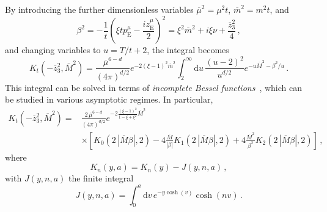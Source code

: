 By introducing the further dimensionless variables $\overline{\mu}^2 = \mu^2 t$,
$\overline{m}^2 = m^2 t$, and 
\begin{equation}
        \beta^2 = -\frac{1}{t} 
        \left(\xi t p_{\mathrm{E}}^\mu - \frac{iz_{\mathrm{E}}^\mu}{2}\right)^2
         = \xi^2 \overline{m}^2+i \xi \nu + 
         \frac{\overline{z}_3^2}{4}\, ,
\end{equation}
and changing variables to $u = T/t + 2$, the integral becomes
\begin{equation}
        K_t\left(-\overline{z}_3^2, \overline{M}^2\right) = 
        \frac{\overline{\mu}^{6-d}}{(4\pi)^{d/2}} e^{-2(\xi-1)^2\overline{m}^2}
        \int_{2}^\infty \mathrm{d}u\,
        \frac{(u-2)^2}{u^{d/2}} e^{-u\overline{M}^2-\beta^2/u}\, .
\end{equation}
This integral can be solved in terms of {\em incomplete Bessel
functions}~\cite{Cichetti:2004,Jones:2007,Harris:2008}, which can be studied in
various asymptotic regimes. In particular,
\begin{align}
        \label{eq:Ktdimless}
        K_t\left(-\overline{z}_3^2, \overline{M}^2\right) = 
        {} & \frac{2\,\overline{\mu}^{6-d}}{(4\pi)^{d/2}}
        e^{-2\frac{(\xi-1)^2}{1-\xi+\xi^2}\overline{M}^2} \nonumber \\
        {} & \times \left[K_0(2\,|\overline{M}\beta|,2) - 
        4\frac{\overline{M}}{|\beta|} 
        K_1(2\,|\overline{M}\beta|,2) + 
        4\frac{\overline{M}^2}{\beta^2} K_2(2\,|\overline{M}\beta|,2)\right]\, ,
\end{align}
where
\begin{equation}
        \label{eq:Kndef}
        K_n(y,a) = K_n(y) - J(y,n,a)\, ,
\end{equation}
with $J(y,n,a)$ the finite integral
\begin{equation}
        \label{eq:J}
        J(y,n,a) = \int_0^a \mathrm{d}v\, e^{-y \cosh(v)}\cosh(nv)\, .
\end{equation}

